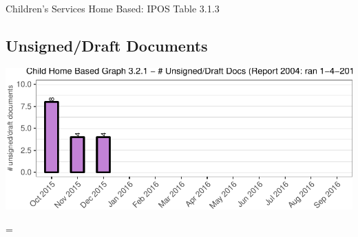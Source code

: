 \documentclass{article}\usepackage[]{graphicx}\usepackage[]{color}
\makeatletter
\def\maxwidth{ %
  \ifdim\Gin@nat@width>\linewidth
    \linewidth
  \else
    \Gin@nat@width
  \fi
}
\newenvironment{knitrout}{}{} %
\newenvironment{absolutelynopagebreak}
  {\par\nobreak\vfil\penalty0\vfilneg
   \vtop\bgroup}
  {\par\xdef\tpd{\the\prevdepth}\egroup
   \prevdepth=\tpd}
\makeatother
\begin{document}
\begin{minipage}{\linewidth} { Children's Services Home Based: IPOS Table 3.1.3 \newline } %
 \par \bigskip \end{minipage}

\begin{absolutelynopagebreak}
\subsection{Unsigned/Draft Documents}
\begin{knitrout}
\color{fgcolor}
\includegraphics[width=\maxwidth]{figure/hb_p_unsign-1} 

\end{knitrout}
\end{absolutelynopagebreak}

\end{document}
